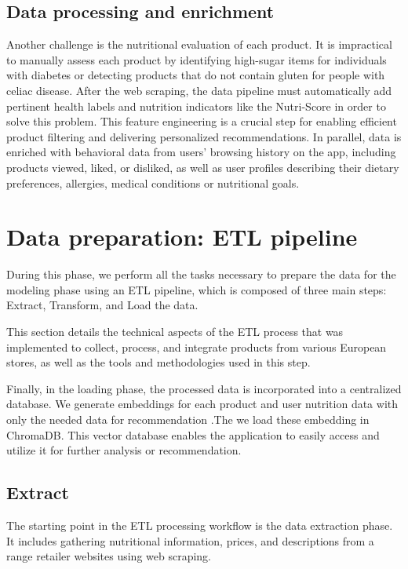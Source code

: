 \subsection{Data processing and enrichment}
Another challenge is the nutritional evaluation of each product. It is impractical to manually assess each product by identifying high-sugar items for individuals with diabetes or detecting products that do not contain gluten for people with celiac disease.
After the web scraping, the data pipeline must automatically add pertinent health labels and nutrition indicators like the Nutri-Score in order to solve this problem. This feature engineering is a crucial step for enabling efficient product filtering and delivering personalized recommendations.
In parallel, data is enriched with behavioral data from users' browsing history on the app, including products viewed, liked, or disliked, as well as user profiles describing their dietary preferences, allergies, medical conditions or nutritional goals.

\section{Data preparation: ETL pipeline}


During this phase, we perform all the tasks necessary to prepare the data for the modeling phase using an ETL pipeline, which is composed of three main steps: Extract, Transform, and Load the data.

This section details the technical aspects of the ETL process that was implemented to collect, process, and integrate products from various European stores, as well as the tools and methodologies used in this step.


Finally, in the loading phase, the processed data is incorporated into a centralized database. We generate embeddings for each product and user nutrition data with only the needed data for recommendation .The we load these embedding in ChromaDB. This vector database  enables the application to easily access and utilize it for further analysis or recommendation.

\subsection{Extract}

The starting point in the ETL  processing workflow is the data extraction phase. It includes gathering nutritional information, prices, and descriptions  from a range retailer websites using web scraping.

